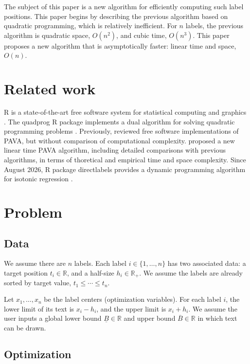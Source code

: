 \documentclass{article}
\begin{document}
The subject of this paper is a new algorithm for efficiently computing such label positions.
This paper begins by describing the previous algorithm based on quadratic programming, which is relatively inefficient.
For $n$ labels, the previous algorithm is quadratic space, $O(n^2)$, and cubic time, $O(n^3)$.
This paper proposes a new algorithm that is asymptotically faster: linear time and space, $O(n)$.

\section{Related work}
R is a state-of-the-art free software system for statistical computing and graphics \citep{R}.
The quadprog R package \citep{quadprog} implements a dual algorithm for solving quadratic programming problems \citep{goldfarb1983numerically}.
Previously, \citet{de2009isotone} reviewed free software implementations of PAVA, but without comparison of computational complexity.
\citet{busing2022monotone} proposed a new linear time PAVA algorithm, including detailed comparisons with previous algorithms, in terms of thoretical and empirical time and space complexity.
Since August 2026, R package directlabels provides a dynamic programming algorithm for isotonic regression \citep{directlabels}.

\section{Problem}

\subsection{Data}

We assume there are $n$ labels.
Each label $i\in\{1,\dots,n\}$ has two associated data: a target position $t_i\in\mathbb R$, and a half-size $h_i\in\mathbb R_+$.
We assume the labels are already sorted by target value, $t_1\leq\cdots\leq t_n$.

Let $x_1,\dots,x_n$ be the label centers (optimization variables).
For each label $i$, the lower limit of its text is $x_i-h_i$, and the upper limit is $x_i+h_i$.
We assume the user inputs a global lower bound $\underline B\in\mathbb R$ and upper bound $\overline B\in\mathbb R$ in which text can be drawn.

\subsection{Optimization}
\end{document}

